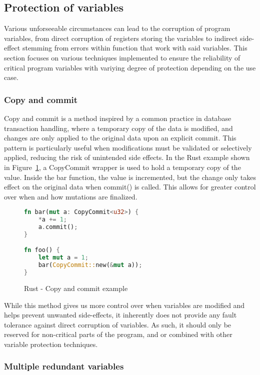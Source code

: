 \subsection{Protection of variables} \label{sec:var_protection}

Various unforseeable circumstances can lead to the corruption of program variables, from direct corruption of registers storing the variables to indirect side-effect stemming from errors within function that work with said variables. This section focuses on various techniques implemented to ensure the reliability of critical program variables with variying degree of protection depending on the use case.

\subsubsection{Copy and commit}

Copy and commit is a method inspired by a common practice in database transaction handling, where a temporary copy of the data is modified, and changes are only applied to the original data upon an explicit commit. This pattern is particularly useful when modifications must be validated or selectively applied, reducing the risk of unintended side effects. In the Rust example shown in Figure~\ref{fig:rust_copy_commit}, a CopyCommit wrapper is used to hold a temporary copy of the value. Inside the bar function, the value is incremented, but the change only takes effect on the original data when commit() is called. This allows for greater control over when and how mutations are finalized.

\begin{figure}[!h]
\begin{lstlisting}[language=Rust]
fn bar(mut a: CopyCommit<u32>) {
    *a += 1;
    a.commit();
}

fn foo() {
    let mut a = 1;
    bar(CopyCommit::new(&mut a));
}
\end{lstlisting}
\caption{Rust - Copy and commit example}
\label{fig:rust_copy_commit}
\end{figure}

While this method gives us more control over when variables are modified and helps prevent unwanted side-effects, it inherently does not provide any fault tolerance against direct corruption of variables. As such, it should only be reserved for non-critical parts of the program, and or combined with other variable protection techniques.

\subsubsection{Multiple redundant variables}

